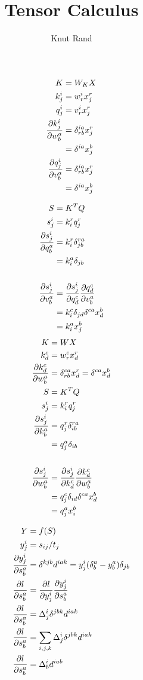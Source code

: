 \documentclass[20pt]{article}         %
\title{Tensor Calculus}
\author{Knut Rand}
\begin{document}
\begin{align*}
  K &= W_KX\\
  k^i_j &= w^i_rx^r_j\\
  q^i_j &= v^i_rx^r_j\\
  \pdv{k^i_j}{w^a_b} &= \delta^{ia}_{rb}x^r_j\\
  &= \delta^{ia}x^b_j\\
  \pdv{q^i_j}{v^a_b} &= \delta^{ia}_{rb}x^r_j\\
  &= \delta^{ia}x^b_j\\
\end{align*}

\begin{align*}
  S &= K^TQ\\
  s^i_j &= k^r_iq^r_j\\
  \pdv{s^i_j}{q^a_b} &= k^r_i\delta^{ra}_{jb}\\
  &= k^a_i\delta_{jb}\\
  &\\
  \pdv{s^i_j}{v^a_b} &= \pdv{s^i_j}{q^c_d}\pdv{q^c_d}{v^a_b}\\
  &= k^c_i\delta_{jd} \delta^{ca}x^b_d\\
  &= k^a_ix^b_j\\
\end{align*}
\begin{align*}
  K &= WX\\
  k^c_d &= w^c_rx^r_d\\
  \pdv{k^c_d}{w^a_b} &= \delta^{ca}_{rb}x^r_d = \delta^{ca}x^b_d\\
  S &= K^TQ\\
  s^i_j &= k^r_iq^r_j\\
  \pdv{s^i_j}{k^a_b} &= q^r_j\delta^{ra}_{ib}\\
  &= q^a_j\delta_{ib}\\
  &\\
  \pdv{s^i_j}{w^a_b} &= \pdv{s^i_j}{k^c_d}\pdv{k^c_d}{w^a_b}\\
  &= q^c_j\delta_{id}\delta^{ca}x^b_d\\
  &= q^a_jx^b_i\\
\end{align*}

\begin{align*}
  Y &= f(S)\\
  y^i_j &= s_{ij}/t_j\\
  \pdv{y^i_j}{s^a_b} &= \delta^{kjb}d^{iak} = y^i_j(\delta^a_b-y^a_b)\delta_{jb}\\
  \pdv{l}{s^a_b} &= \pdv{l}{y^i_j}\pdv{y^i_j}{s^a_b}\\
  \pdv{l}{s^a_b} &= \Delta^i_j\delta^{jbk}d^{iak}\\
  \pdv{l}{s^a_b} &= \sum_{i,j,k}\Delta^i_j\delta^{jbk}d^{iak}\\
  \pdv{l}{s^a_b} &= \Delta^i_bd^{iab}\\
\end{align*}
\end{document}
